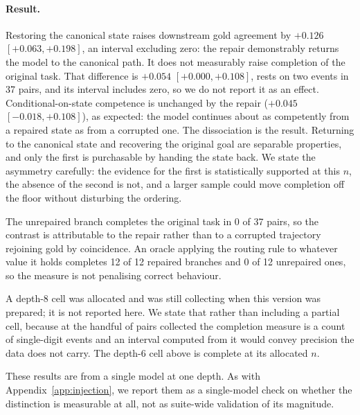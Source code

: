 \documentclass{article}
\begin{document}
\paragraph{Result.} Restoring the canonical state raises downstream gold agreement by
$+0.126$ $[+0.063,+0.198]$, an interval excluding zero: the repair demonstrably returns the
model to the canonical path. It does not measurably raise completion of the original task.
That difference is $+0.054$ $[+0.000,+0.108]$, rests on two events in 37 pairs, and its
interval includes zero, so we do not report it as an effect. Conditional-on-state
competence is unchanged by the repair ($+0.045$ $[-0.018,+0.108]$), as expected: the model
continues about as competently from a repaired state as from a corrupted one. The
dissociation is the result. Returning to the canonical state and recovering the original
goal are separable properties, and only the first is purchasable by handing the state back.
We state the asymmetry carefully: the evidence for the first is statistically supported at
this $n$, the absence of the second is not, and a larger sample could move completion off
the floor without disturbing the ordering.

The unrepaired branch completes the original task in 0 of 37 pairs, so the contrast is
attributable to the repair rather than to a corrupted trajectory rejoining gold by
coincidence. An oracle applying the routing rule to whatever value it holds completes 12 of
12 repaired branches and 0 of 12 unrepaired ones, so the measure is not penalising correct
behaviour.

A depth-8 cell was allocated and was still collecting when this version was
prepared; it is not reported here. We state that rather than including a partial
cell, because at the handful of pairs collected the completion measure is a count of
single-digit events and an interval computed from it would convey precision the data
does not carry. The depth-6 cell above is complete at its allocated $n$.

These results are from a single model at one depth. As with
Appendix~\ref{app:injection}, we report them as a single-model check on whether the
distinction is measurable at all, not as suite-wide validation of its magnitude.
\end{document}
